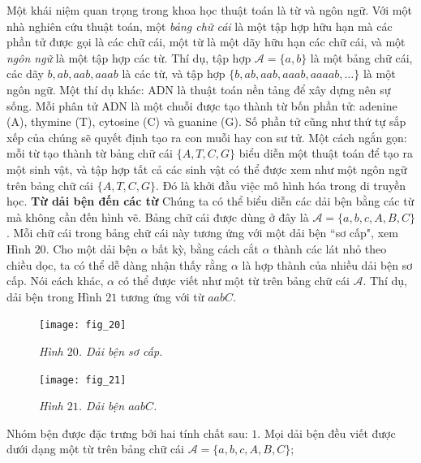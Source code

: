 \begin{multicols}{2}
	\vskip 0.1cm
	Một khái niệm quan trọng trong khoa học thuật toán là từ và ngôn ngữ. Với một nhà nghiên cứu thuật toán, một \textit{bảng chữ cái} là một tập hợp hữu hạn mà các phần tử được gọi là các chữ cái, một từ là một dãy hữu hạn các chữ cái, và một \textit{ngôn ngữ} là một tập hợp các từ. Thí dụ, tập hợp $\mathcal A = \{a, b\}$ là một bảng chữ cái, các dãy $b, ab, aab, aaab$ là các từ, và tập hợp $\{b, ab, aab, aaab, aaaab, \dots\}$ là một ngôn ngữ. Một thí dụ khác: ADN là thuật toán nền tảng để xây dựng nên sự sống. Mỗi phân tử ADN là một chuỗi được tạo thành từ bốn phần tử: adenine (A), thymine (T), cytosine (C) và guanine (G). Số phần tử cũng như thứ tự sắp xếp của chúng sẽ quyết định tạo ra con muỗi hay con sư tử. Một cách ngắn gọn: mỗi từ tạo thành từ bảng chữ cái $\{A, T, C, G\}$ biểu diễn một thuật toán để tạo ra một sinh vật, và tập hợp tất cả các sinh vật có thể được xem như một ngôn ngữ trên bảng chữ cái $\{A, T, C, G\}$. Đó là khởi đầu việc mô hình hóa trong di truyền học.
	\vskip 0.1cm
	\textbf{\color{duongvaotoanhoc}Từ dải bện đến các từ}
	\vskip 0.1cm
	Chúng ta có thể biểu diễn các dải bện bằng các từ mà không cần đến hình vẽ. Bảng chữ cái được dùng ở đây là $\mathcal A = \{a, b, c, A, B, C\}$. Mỗi chữ cái trong bảng chữ cái này tương ứng với một dải bện ``sơ cấp", xem Hình $20$. Cho một dải bện $\alpha$ bất kỳ, bằng cách cắt $\alpha$ thành các lát nhỏ theo chiều dọc, ta có thể dễ dàng nhận thấy rằng $\alpha$ là hợp thành của nhiều dải bện sơ cấp. Nói cách khác, $\alpha$ có thể được viết như một từ trên bảng chữ cái $\mathcal A$. Thí dụ, dải bện trong Hình $21$ tương ứng với từ $aabC$.
	\begin{figure}[H]
		\vspace*{-5pt}
		\centering
		\captionsetup{labelformat= empty, justification=centering}
		\texttt{[image: fig\_20]}
		\caption{\small\textit{\color{duongvaotoanhoc}Hình $20$. Dải bện sơ cấp.}}
	\end{figure}
	\begin{figure}[H]
		\vspace*{5pt}
		\centering
		\captionsetup{labelformat= empty, justification=centering}
		\texttt{[image: fig\_21]}
		\caption{\small\textit{\color{duongvaotoanhoc}Hình $21$. Dải bện $aabC$.}}
		\vspace*{-10pt}
	\end{figure}
	Nhóm bện được đặc trưng bởi hai tính chất sau:
	\vskip 0.1cm
	$1$. Mọi dải bện đều viết được dưới dạng một từ trên bảng chữ cái $\mathcal A = \{a, b, c, A, B, C\}$;

\end{multicols}
